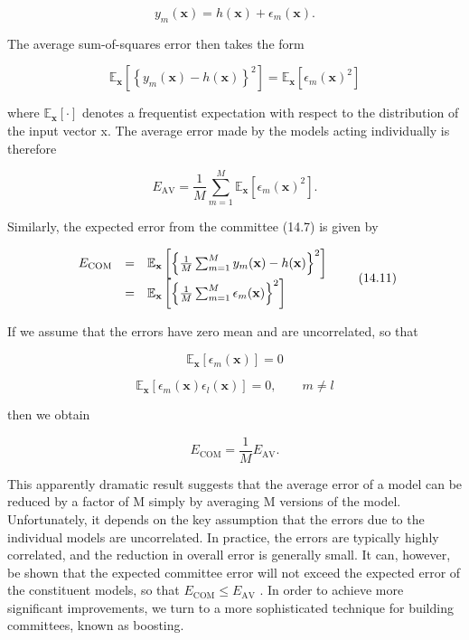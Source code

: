 \documentclass[
  10
]{article}
\begin{document}
\[
y _ {m} (\mathbf {x}) = h (\mathbf {x}) + \epsilon_ {m} (\mathbf {x}).\tag{14.8}
\]

The average sum-of-squares error then takes the form

\[
\mathbb {E} _ {\mathbf {x}} \left[ \left\{y _ {m} (\mathbf {x}) - h (\mathbf {x}) \right\} ^ {2} \right] = \mathbb {E} _ {\mathbf {x}} \left[ \epsilon_ {m} (\mathbf {x}) ^ {2} \right]\tag{14.9}
\]

where \(\mathbb { E } _ { \mathbf { x } } [ \cdot ]\) denotes a
frequentist expectation with respect to the distribution of the input
vector x. The average error made by the models acting individually is
therefore

\[
E _ {\mathrm{AV}} = \frac {1}{M} \sum_ {m = 1} ^ {M} \mathbb {E} _ {\mathbf {x}} \left[ \epsilon_ {m} (\mathbf {x}) ^ {2} \right].\tag{14.10}
\]

Similarly, the expected error from the committee (14.7) is given by

\[
\begin{array}{r c l} E _ {\mathrm{COM}} & = & \mathbb {E} _ {\mathbf {x}} \left[ \left\{\frac {1}{M} \sum_ {m = 1} ^ {M} y _ {m} (\mathbf {x}) - h (\mathbf {x}) \right\} ^ {2} \right] \\ & = & \mathbb {E} _ {\mathbf {x}} \left[ \left\{\frac {1}{M} \sum_ {m = 1} ^ {M} \epsilon_ {m} (\mathbf {x}) \right\} ^ {2} \right] \end{array}\tag{14.11}
\]

If we assume that the errors have zero mean and are uncorrelated, so
that

\[
\mathbb {E} _ {\mathbf {x}} \left[ \epsilon_ {m} (\mathbf {x}) \right] = 0\tag{14.12}
\]

\[
\mathbb {E} _ {\mathbf {x}} \left[ \epsilon_ {m} (\mathbf {x}) \epsilon_ {l} (\mathbf {x}) \right] = 0, \qquad m \neq l\tag{14.13}
\]

then we obtain

\[
E _ {\mathrm{COM}} = \frac {1}{M} E _ {\mathrm{AV}}.\tag{14.14}
\]

This apparently dramatic result suggests that the average error of a
model can be reduced by a factor of M simply by averaging M versions of
the model. Unfortunately, it depends on the key assumption that the
errors due to the individual models are uncorrelated. In practice, the
errors are typically highly correlated, and the reduction in overall
error is generally small. It can, however, be shown that the expected
committee error will not exceed the expected error of the constituent
models, so that
\(E _ { \mathrm { C O M } } \leqslant E _ { \mathrm { A V } }\) . In
order to achieve more significant improvements, we turn to a more
sophisticated technique for building committees, known as boosting.
\end{document}
